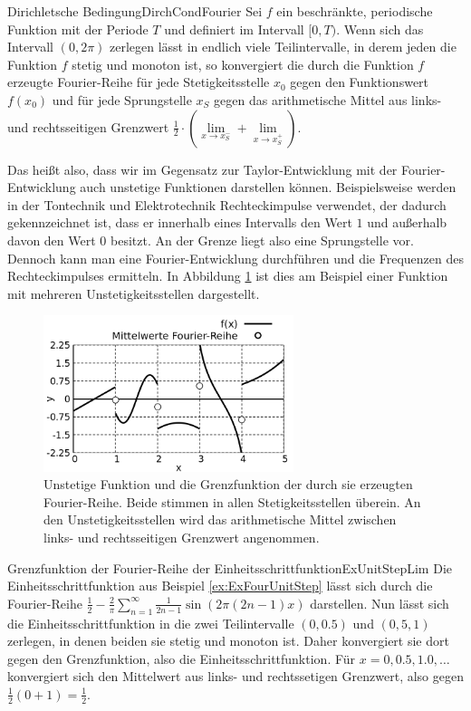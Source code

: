 \begin{statement}{Dirichletsche Bedingung}{DirchCondFourier}
    Sei $f$ ein beschränkte, periodische Funktion mit der Periode $T$ und definiert im Intervall $[0,T)$. Wenn sich das Intervall $(0,2\pi)$ zerlegen lässt in endlich viele Teilintervalle, in derem jeden die Funktion $f$ stetig und monoton ist, so konvergiert die durch die Funktion $f$ erzeugte Fourier-Reihe für jede Stetigkeitsstelle $x_0$ gegen den Funktionswert $f(x_0)$ und für jede Sprungstelle $x_S$ gegen das arithmetische Mittel aus links- und rechtsseitigen Grenzwert $\frac{1}{2} \cdot \left(\lim\limits_{x\to x_S^-} + \lim\limits_{x\to x_S^+}\right)$.
\end{statement}

Das heißt also, dass wir im Gegensatz zur Taylor-Entwicklung mit der Fourier-Entwicklung auch unstetige Funktionen darstellen können. Beispielsweise werden in der Tontechnik und Elektrotechnik Rechteckimpulse verwendet, der dadurch gekennzeichnet ist, dass er innerhalb eines Intervalls den Wert $1$ und außerhalb davon den Wert $0$ besitzt. An der Grenze liegt also eine Sprungstelle vor. Dennoch kann man eine Fourier-Entwicklung durchführen und die Frequenzen des Rechteckimpulses ermitteln. In Abbildung \ref{fig:ExFourierDirichlet} ist dies am Beispiel einer Funktion mit mehreren Unstetigkeitsstellen dargestellt.

\begin{figure}
    \centering
    \includegraphics[width=0.65\textwidth]{./gnuplot/fourier-dirichlet}
    \caption[Fourier-Reihe einer unstetigen Funktion]{Unstetige Funktion und die Grenzfunktion der durch sie erzeugten Fourier-Reihe. Beide stimmen in allen Stetigkeitsstellen überein. An den Unstetigkeitsstellen wird das arithmetische Mittel zwischen links- und rechtsseitigen Grenzwert angenommen.}
    \label{fig:ExFourierDirichlet}
\end{figure}

\begin{example}{Grenzfunktion der Fourier-Reihe der Einheitsschrittfunktion}{ExUnitStepLim}
    Die Einheitsschrittfunktion aus Beispiel \ref{ex:ExFourUnitStep} lässt sich durch die Fourier-Reihe $\frac{1}{2} - \frac{2}{\pi} \sum\limits_{n=1}^\infty \frac{1}{2n-1} \sin(2\pi (2n-1) x)$ darstellen. Nun lässt sich die Einheitsschrittfunktion in die zwei Teilintervalle $(0, 0.5)$ und $(0,5, 1)$ zerlegen, in denen beiden sie stetig und monoton ist. Daher konvergiert sie dort gegen den Grenzfunktion, also die Einheitsschrittfunktion. Für $x=0,0.5,1.0,\dots$ konvergiert sich den Mittelwert aus links- und rechtssetigen Grenzwert, also gegen $\frac{1}{2} (0+1) = \frac{1}{2}$.
\end{example}

